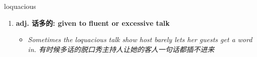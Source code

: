 
\begin{frame}
{\huge loquacious}
\begin{center}
\begin{enumerate}\Large
  \item \textbf{adj. 话多的: given to fluent or excessive talk}
  \begin{itemize}
    \item \em{\Large{Sometimes the loquacious talk show host barely lets her guests get a word in. 有时候多话的脱口秀主持人让她的客人一句话都插不进来}}
  \end{itemize}
\end{enumerate}
\end{center}
\end{frame}
